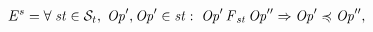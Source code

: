 \documentclass[journal,compsoc]{IEEEtran}
\begin{document}
\begin{align}\label{eqn:Causal}
\begin{split}
E^{s} = \forall \; \mathit{st} \in \mathcal{S}_t, \; {\mathit{Op}}', {\mathit{Op}}' \in \mathit{st} : \; {\mathit{Op}}' \operatorname{\it F}_\mathit{st} {\mathit{Op}}''
 \Rightarrow {\mathit{Op}}' \preccurlyeq {\mathit{Op}}'' , 
 \end{split}
  \end{align} %
\end{document}
